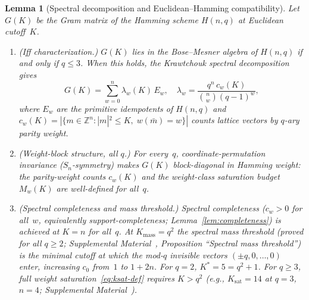 \documentclass[twocolumn,prx,aps,superscriptaddress,longbibliography,floatfix]{revtex4-2}
\newtheorem{lemma}[theorem]{Lemma}
\newcommand{\pclaim}[4]{}
\begin{document}
\pclaim{env:lem:spectral_q_main}{proved}{*}{lem:spectral_q_main}%
\begin{lemma}[Spectral decomposition and Euclidean--Hamming compatibility]
\label{lem:spectral_q_main}
Let $G(K)$ be the Gram matrix of the Hamming scheme $H(n,q)$
at Euclidean cutoff~$K$.
\begin{enumerate}
\item[\emph{(i)}] \emph{(Iff characterization.)}
$G(K)$ lies in the Bose--Mesner algebra of $H(n,q)$ if and only
if $q \le 3$.  When this holds, the Krawtchouk spectral
decomposition gives
\begin{equation}\label{eq:spectral_q_main}
  G(K) = \sum_{w=0}^{n} \lambda_w(K)\, E_w, \quad
  \lambda_w = \frac{q^n \, c_w(K)}{\binom{n}{w}(q{-}1)^w},
\end{equation}
where $E_w$ are the primitive idempotents of $H(n,q)$ and
$c_w(K) = |\{m \in \mathbb{Z}^n : |m|^2 \le K,\;
w(\bar{m}) = w\}|$ counts lattice vectors by $q$-ary parity
weight.
\item[\emph{(ii)}] \emph{(Weight-block structure, all $q$.)}
For every~$q$, coordinate-permutation invariance
($S_n$-symmetry) makes $G(K)$ block-diagonal in Hamming
weight: the parity-weight counts $c_w(K)$ and the
weight-class saturation budget $M_w(K)$ are well-defined
for all~$q$.
\item[\emph{(iii)}] \emph{(Spectral completeness and mass threshold.)}
Spectral completeness ($c_w > 0$ for all~$w$, equivalently
support-completeness; Lemma~\ref{lem:completeness}) is achieved
at $K = n$ for all~$q$.
At $K_{\mathrm{mass}} = q^2$ the spectral mass threshold
(proved for all $q \ge 2$;
Supplemental Material~\cite{supplemental},
Proposition ``Spectral mass threshold'')
is the minimal cutoff at
which the mod-$q$ invisible vectors $(\pm q, 0, \ldots, 0)$
enter, increasing $c_0$ from~$1$ to $1 + 2n$.
For $q = 2$, $K^* = 5 = q^2 + 1$.
For $q \ge 3$, full weight
saturation~\eqref{eq:ksat-def} requires $K > q^2$
(e.g., $K_{\mathrm{sat}} = 14$ at $q = 3$, $n = 4$;
Supplemental Material~\cite{supplemental}).
\end{enumerate}
\end{lemma}
\end{document}
